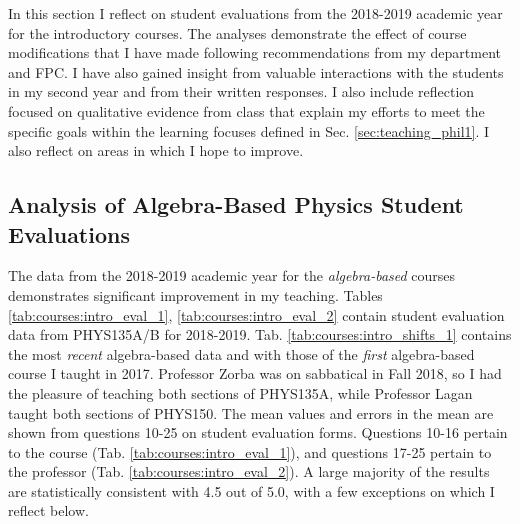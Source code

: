 \documentclass[../../main.tex]{subfiles}
\begin{document}
\label{sec:oof}

In this section I reflect on student evaluations from the 2018-2019 academic year for the introductory courses.  The analyses demonstrate the effect of course modifications that I have made following recommendations from my department and FPC.  I have also gained insight from valuable interactions with the students in my second year and from their written responses.  I also include reflection focused on qualitative evidence from class that explain my efforts to meet the specific goals within the learning focuses defined in Sec. \ref{sec:teaching_phil1}.  I also reflect on areas in which I hope to improve.  \\ \hspace{0.1cm}

\subsection{Analysis of Algebra-Based Physics Student Evaluations}

The data from the 2018-2019 academic year for the \textit{algebra-based} courses demonstrates significant improvement in my teaching.  Tables \ref{tab:courses:intro_eval_1}, \ref{tab:courses:intro_eval_2} contain student evaluation data from PHYS135A/B for 2018-2019.  Tab. \ref{tab:courses:intro_shifts_1} contains the most \textit{recent} algebra-based data and with those of the \textit{first} algebra-based course I taught in 2017.  Professor Zorba was on sabbatical in Fall 2018, so I had the pleasure of teaching both sections of PHYS135A, while Professor Lagan taught both sections of PHYS150.  The mean values and errors in the mean are shown from questions 10-25 on student evaluation forms.  Questions 10-16 pertain to the course (Tab. \ref{tab:courses:intro_eval_1}), and questions 17-25 pertain to the professor (Tab. \ref{tab:courses:intro_eval_2}).  A large majority of the results are statistically consistent with 4.5 out of 5.0, with a few exceptions on which I reflect below. \\ \hspace{0.1cm}
\end{document}
